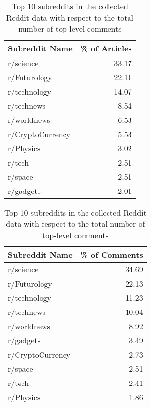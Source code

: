 \begin{table}
\parbox{.45\linewidth}{
\centering
\begin{tabular}{lr}
\hline
 Subreddit Name   &   \% of Articles\\
\hline
 r/science        &                    33.17 \\
 r/Futurology     &                    22.11 \\
 r/technology     &                    14.07 \\
 r/technews       &                     8.54 \\
 r/worldnews      &                     6.53 \\
 r/CryptoCurrency &                     5.53 \\
 r/Physics        &                     3.02 \\
 r/tech           &                     2.51 \\
 r/space          &                     2.51 \\
 r/gadgets        &                     2.01 \\
\hline
\end{tabular}
\label{tab:top_subreddits_to_articles}
\vspace{5pt}
\caption{Top 10 subreddits in the collected Reddit data with respect to the number of articles}
}
\hfill
\parbox{.45\linewidth}{
\centering
\begin{tabular}{lr}
\hline
 Subreddit Name   &  \% of Comments \\
\hline
 r/science        &                    34.69 \\
 r/Futurology     &                    22.13 \\
 r/technology     &                    11.23 \\
 r/technews       &                    10.04 \\
 r/worldnews      &                     8.92 \\
 r/gadgets        &                     3.49 \\
 r/CryptoCurrency &                     2.73 \\
 r/space          &                     2.51 \\
 r/tech           &                     2.41 \\
 r/Physics        &                     1.86 \\
\hline
\end{tabular}
\label{tab:top_subreddits_to_tldcomments}
 \vspace{5pt}
\caption{Top 10 subreddits in the collected Reddit data with respect to the total number of top-level comments}
}
\end{table}
